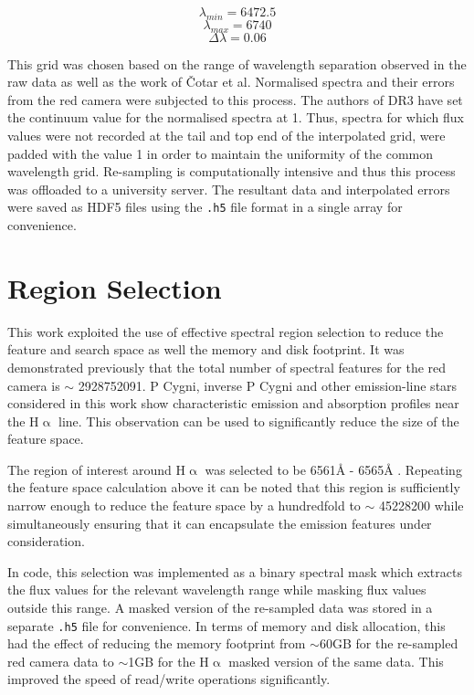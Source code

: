 \[\lambda_{min} = 6472.5\]
\[\lambda_{max} = 6740\]
\[\Delta\lambda = 0.06\]

This grid was chosen based on the range of wavelength separation observed in the raw data as well as the work of Čotar et al. Normalised spectra and their errors from the red camera were subjected to this process. The authors of DR3 have set the continuum value for the normalised spectra at 1. Thus, spectra for which flux values were not recorded at the tail and top end of the interpolated grid, were padded with the value 1 in order to maintain the uniformity of the common wavelength grid. Re-sampling is computationally intensive and thus this process was offloaded to a university server. The resultant data and interpolated errors were saved as HDF5 files using the \texttt{.h5} file format in a single array for convenience. 

\section{Region Selection}

This work exploited the use of effective spectral region selection to reduce the feature and search space as well the memory and disk footprint. It was demonstrated previously that the total number of spectral features for the red camera is $\sim$ \num[round-precision=2,round-mode=figures, scientific-notation=true]{2928752091}. P Cygni, inverse P Cygni and other emission-line stars considered in this work show characteristic emission and absorption profiles near the H$\upalpha$ line. This observation can be used to significantly reduce the size of the feature space. 

The region of interest around H$\upalpha$ was selected to be 6561\r{A} - 6565\r{A} \cite{traven2017galah}. Repeating the feature space calculation above it can be noted that this region is sufficiently narrow enough to reduce the feature space by a hundredfold to $\sim$ \num[round-precision=2,round-mode=figures, scientific-notation=true]{45228200} while simultaneously ensuring that it can encapsulate the emission features under consideration. 

In code, this selection was implemented as a binary spectral mask which extracts the flux values for the relevant wavelength range while masking flux values outside this range. A masked version of the re-sampled data was stored in a separate \texttt{.h5} file for convenience. In terms of memory and disk allocation, this had the effect of reducing the memory footprint from $\sim$60GB for the re-sampled red camera data to $\sim$1GB for the H$\upalpha$ masked version of the same data. This improved the speed of read/write operations significantly. 

